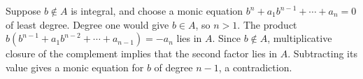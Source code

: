 Suppose $b\notin A$ is integral, and choose a monic equation $b^n+a_1b^{n-1}+\cdots+a_n=0$ of least degree. Degree one would give $b\in A$, so $n>1$. The product $b(b^{n-1}+a_1b^{n-2}+\cdots+a_{n-1})=-a_n$ lies in $A$. Since $b\notin A$, multiplicative closure of the complement implies that the second factor lies in $A$. Subtracting its value gives a monic equation for $b$ of degree $n-1$, a contradiction.
